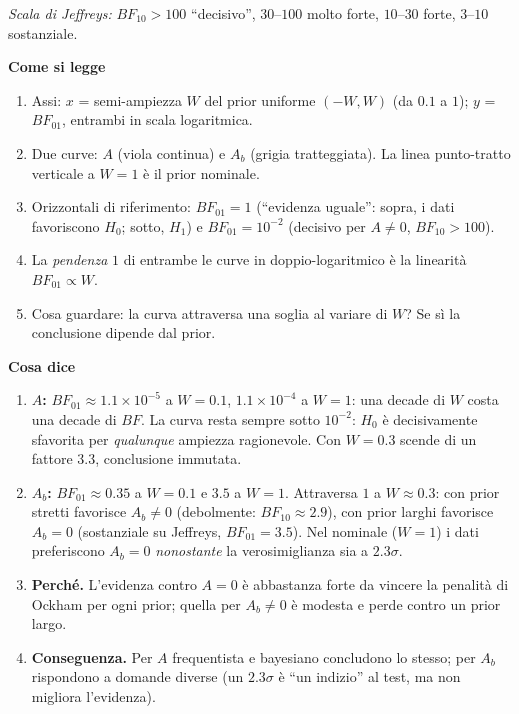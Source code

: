 \documentclass[10.5pt,a4paper]{article}
\newcommand{\sez}[1]{\par\Needspace{6\baselineskip}\medskip\noindent\textbf{\large #1}\par\nopagebreak\smallskip}
\begin{document}
\emph{Scala di Jeffreys:} $BF_{10}>100$ ``decisivo'', $30$--$100$ molto forte, $10$--$30$ forte, $3$--$10$ sostanziale.

\sez{Come si legge}
\begin{enumerate}
\item Assi: $x$ = semi-ampiezza $W$ del prior uniforme $(-W,W)$ (da $0.1$ a $1$); $y$ = $BF_{01}$, entrambi in scala logaritmica.
\item Due curve: $A$ (viola continua) e $A_b$ (grigia tratteggiata). La linea punto-tratto verticale a $W=1$ è il prior nominale.
\item Orizzontali di riferimento: $BF_{01}=1$ (``evidenza uguale'': sopra, i dati favoriscono $H_0$; sotto, $H_1$) e $BF_{01}=10^{-2}$ (decisivo per $A\neq0$, $BF_{10}>100$).
\item La \emph{pendenza} $1$ di entrambe le curve in doppio-logaritmico è la linearità $BF_{01}\propto W$.
\item Cosa guardare: la curva attraversa una soglia al variare di $W$? Se sì la conclusione dipende dal prior.
\end{enumerate}

\sez{Cosa dice}
\begin{enumerate}
\item \textbf{$A$:} $BF_{01}\approx1.1\times10^{-5}$ a $W=0.1$, $1.1\times10^{-4}$ a $W=1$: una decade di $W$ costa una decade di $BF$. La curva resta sempre sotto $10^{-2}$: $H_0$ è decisivamente sfavorita per \emph{qualunque} ampiezza ragionevole. Con $W=0.3$ scende di un fattore $3.3$, conclusione immutata.
\item \textbf{$A_b$:} $BF_{01}\approx0.35$ a $W=0.1$ e $3.5$ a $W=1$. Attraversa $1$ a $W\approx0.3$: con prior stretti favorisce $A_b\neq0$ (debolmente: $BF_{10}\approx2.9$), con prior larghi favorisce $A_b=0$ (sostanziale su Jeffreys, $BF_{01}=3.5$). Nel nominale ($W=1$) i dati preferiscono $A_b=0$ \emph{nonostante} la verosimiglianza sia a $2.3\sigma$.
\item \textbf{Perché.} L'evidenza contro $A=0$ è abbastanza forte da vincere la penalità di Ockham per ogni prior; quella per $A_b\neq0$ è modesta e perde contro un prior largo.
\item \textbf{Conseguenza.} Per $A$ frequentista e bayesiano concludono lo stesso; per $A_b$ rispondono a domande diverse (un $2.3\sigma$ è ``un indizio'' al test, ma non migliora l'evidenza).
\end{enumerate}
\end{document}
